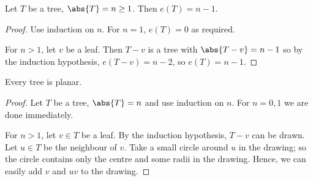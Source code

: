 \documentclass{article}
\begin{document}
\begin{nprop}\label{prop:21}
    Let $T$ be a tree, $\abs{T} = n \geq 1$. Then $e(T) = n-1$.
\end{nprop}
\begin{proof}
    Use induction on $n$. For $n=1$, $e(T) = 0$ as required.

    For $n > 1$, let $v$ be a leaf.
    Then $T - v$ is a tree with $\abs{T - v} = n-1$ so by the induction hypothesis, $e(T-v) = n-2$, so $e(T) = n-1$.
\end{proof}
\begin{nprop}\label{prop:22}
    Every tree is planar.
\end{nprop}
\begin{proof}
    Let $T$ be a tree, $\abs{T} = n$ and use induction on $n$.
    For $n=0,1$ we are done immediately.

    For $n > 1$, let $v \in T$ be a leaf.
    By the induction hypothesis, $T-v$ can be drawn.
    Let $u \in T$ be the neighbour of $v$.
    Take a small circle around $u$ in the drawing; so the circle contains only the centre and some radii in the drawing.
    Hence, we can easily add $v$ and $uv$ to the drawing.
\end{proof}
\end{document}
